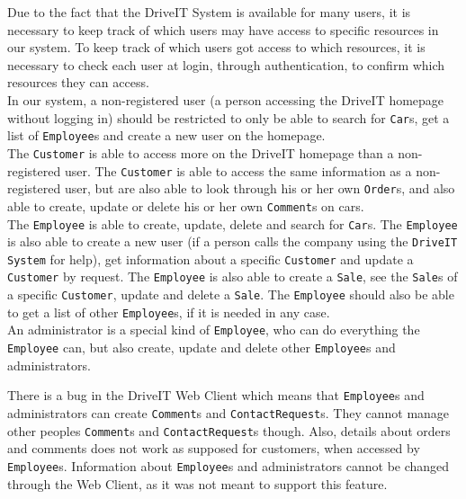 Due to the fact that the DriveIT System is available for many users, it is necessary to keep track of which users may have access to specific resources in our system. To keep track of which users got access to which resources, it is necessary to check each user at login, through authentication, to confirm which resources they can access.\\

In our system, a non-registered user (a person accessing the DriveIT homepage without logging in) should be restricted to only be able to search for \texttt{Car}s, get a list of \texttt{Employee}s and create a new user on the homepage.\\

The \texttt{Customer} is able to access more on the DriveIT homepage than a non-registered user. The \texttt{Customer} is able to access the same information as a non-registered user, but are also able to look through his or her own \texttt{Order}s, and also able to create, update or delete his or her own \texttt{Comment}s on cars.\\

The \texttt{Employee} is able to create, update, delete and search for \texttt{Car}s. The \texttt{Employee} is also able to create a new user (if a person calls the company using the \texttt{DriveIT System} for help), get information about a specific \texttt{Customer} and update a \texttt{Customer} by request. The \texttt{Employee} is also able to create a \texttt{Sale}, see the \texttt{Sale}s of a specific \texttt{Customer}, update and delete a \texttt{Sale}. The \texttt{Employee} should also be able to get a list of other \texttt{Employee}s, if it is needed in any case.\\

An administrator is a special kind of \texttt{Employee}, who can do everything the \texttt{Employee} can, but also create, update and delete other \texttt{Employee}s and administrators.

There is a bug in the DriveIT Web Client which means that \texttt{Employee}s and administrators can create \texttt{Comment}s and \texttt{ContactRequest}s. They cannot manage other peoples \texttt{Comment}s and \texttt{ContactRequest}s though. Also, details about orders and comments does not work as supposed for customers, when accessed by \texttt{Employee}s. Information about \texttt{Employee}s and administrators cannot be changed through the Web Client, as it was not meant to support this feature.
